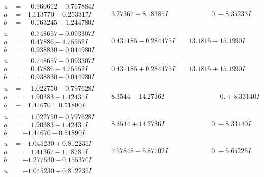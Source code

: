 \documentclass[1p]{elsarticle_modified}
\theoremstyle{definition}
\begin{document}
$$\begin{array}{c|c|c}
\begin{aligned}
u &= \phantom{-}0.960612 - 0.767884 I \\
a &= -1.113770 - 0.253317 I \\
b &= \phantom{-}0.163245 + 1.244780 I\end{aligned}
 & \phantom{-}3.27367 + 8.18385 I & \phantom{-0.000000 } 0. - 8.35233 I \\ \hline\begin{aligned}
u &= \phantom{-}0.748657 + 0.093307 I \\
a &= \phantom{-}0.47886 - 4.75552 I \\
b &= \phantom{-}0.938830 - 0.044980 I\end{aligned}
 & \phantom{-}0.431185 - 0.284475 I & \phantom{-}13.1815 - 15.1990 I \\ \hline\begin{aligned}
u &= \phantom{-}0.748657 - 0.093307 I \\
a &= \phantom{-}0.47886 + 4.75552 I \\
b &= \phantom{-}0.938830 + 0.044980 I\end{aligned}
 & \phantom{-}0.431185 + 0.284475 I & \phantom{-}13.1815 + 15.1990 I \\ \hline\begin{aligned}
u &= \phantom{-}1.022750 + 0.797628 I \\
a &= \phantom{-}1.90383 + 1.42431 I \\
b &= -1.44670 + 0.51890 I\end{aligned}
 & \phantom{-}8.3544 - 14.2736 I & \phantom{-0.000000 -}0. + 8.33140 I \\ \hline\begin{aligned}
u &= \phantom{-}1.022750 - 0.797628 I \\
a &= \phantom{-}1.90383 - 1.42431 I \\
b &= -1.44670 - 0.51890 I\end{aligned}
 & \phantom{-}8.3544 + 14.2736 I & \phantom{-0.000000 } 0. - 8.33140 I \\ \hline\begin{aligned}
u &= -1.045230 + 0.812235 I \\
a &= \phantom{-}1.41367 - 1.18781 I \\
b &= -1.277530 - 0.155370 I\end{aligned}
 & \phantom{-}7.57848 + 5.87702 I & \phantom{-0.000000 } 0. - 5.65225 I \\ \hline\begin{aligned}
u &= -1.045230 - 0.812235 I \\

\end{aligned}
\end{array}$$
\end{document}
